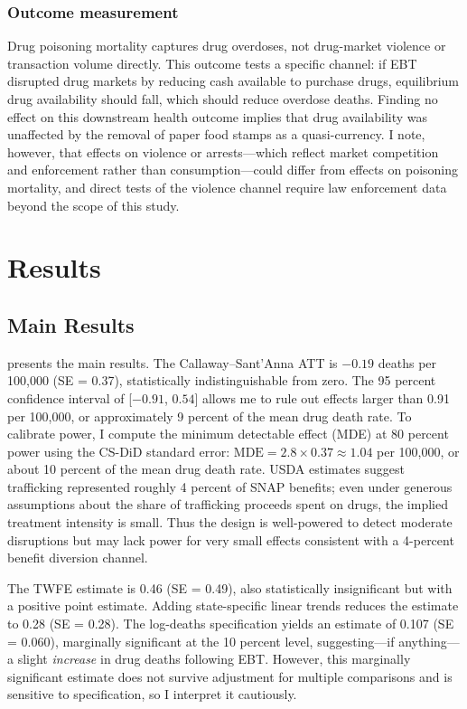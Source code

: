 \documentclass[12pt]{article}
\begin{document}
\subsubsection*{Outcome measurement} Drug poisoning mortality captures drug overdoses, not drug-market violence or transaction volume directly. This outcome tests a specific channel: if EBT disrupted drug markets by reducing cash available to purchase drugs, equilibrium drug availability should fall, which should reduce overdose deaths. Finding no effect on this downstream health outcome implies that drug availability was unaffected by the removal of paper food stamps as a quasi-currency. I note, however, that effects on violence or arrests---which reflect market competition and enforcement rather than consumption---could differ from effects on poisoning mortality, and direct tests of the violence channel require law enforcement data beyond the scope of this study.

\section{Results}
\label{sec:results}

\subsection{Main Results}



 presents the main results. The Callaway--Sant'Anna ATT is $-0.19$ deaths per 100,000 (SE = 0.37), statistically indistinguishable from zero. The 95 percent confidence interval of [$-0.91$, $0.54$] allows me to rule out effects larger than 0.91 per 100,000, or approximately 9 percent of the mean drug death rate. To calibrate power, I compute the minimum detectable effect (MDE) at 80 percent power using the CS-DiD standard error: $\text{MDE} = 2.8 \times 0.37 \approx 1.04$ per 100,000, or about 10 percent of the mean drug death rate. USDA estimates suggest trafficking represented roughly 4 percent of SNAP benefits; even under generous assumptions about the share of trafficking proceeds spent on drugs, the implied treatment intensity is small. Thus the design is well-powered to detect moderate disruptions but may lack power for very small effects consistent with a 4-percent benefit diversion channel.

The TWFE estimate is 0.46 (SE = 0.49), also statistically insignificant but with a positive point estimate. Adding state-specific linear trends reduces the estimate to 0.28 (SE = 0.28). The log-deaths specification yields an estimate of 0.107 (SE = 0.060), marginally significant at the 10 percent level, suggesting---if anything---a slight \textit{increase} in drug deaths following EBT. However, this marginally significant estimate does not survive adjustment for multiple comparisons and is sensitive to specification, so I interpret it cautiously.
\end{document}
